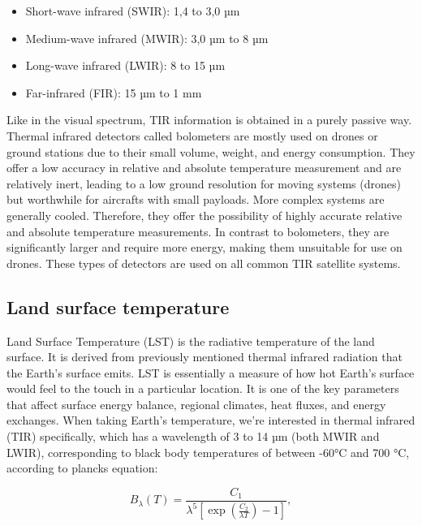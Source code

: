     \begin{itemize}
        \item  Short-wave infrared (SWIR): 1,4 to 3,0 µm
        \item  Medium-wave infrared (MWIR): 3,0 µm to 8 µm
        \item Long-wave infrared (LWIR): 8 to 15 µm
        \item Far-infrared (FIR): 15 µm to 1 mm
    \end{itemize}
    
    Like in the visual spectrum, TIR information is obtained in a purely passive way.
    Thermal infrared detectors called bolometers are mostly used on drones or ground stations due to their small volume, weight, and energy consumption. 
    They offer a low accuracy in relative and absolute temperature measurement and are relatively inert, leading to a low ground resolution for moving systems (drones) but worthwhile for aircrafts with small payloads.     
    More complex systems are generally cooled. Therefore, they offer the possibility of highly accurate relative and absolute temperature measurements.
    In contrast to bolometers, they are significantly larger and require more energy, making them unsuitable for use on drones.
    These types of detectors are used on all common TIR satellite systems.

    \subsection{Land surface temperature}

        Land Surface Temperature (LST) is the radiative temperature of the land surface. It is derived from previously mentioned thermal infrared radiation that the Earth’s surface emits.
        LST is essentially a measure of how hot Earth's surface would feel to the touch in a particular location.
        It is one of the key parameters that affect surface energy balance, regional climates, heat fluxes, and energy exchanges.
        When taking Earth’s temperature, we’re interested in thermal infrared (TIR) specifically, which has a wavelength of 3 to 14 µm (both MWIR and LWIR), corresponding to black body temperatures of between -60°C and 700 °C, according to plancks equation:
        
        \begin{equation}
            B_{\lambda}(T) = \frac{C_1}{\lambda^5 \left[ \exp\left(\frac{C_2}{\lambda T}\right) - 1\right]},
        \end{equation}
        
